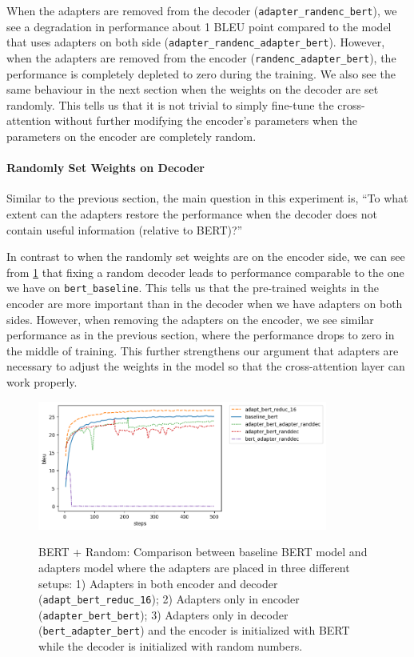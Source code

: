 When the adapters are removed from the decoder (\texttt{adapter\_randenc\_bert}), we see a degradation in performance about 1 BLEU point compared to the model that uses adapters on both side (\texttt{adapter\_randenc\_adapter\_bert}). However, when the adapters are removed from the encoder (\texttt{randenc\_adapter\_bert}), the performance is completely depleted to zero during the training. We also see the same behaviour in the next section when the weights on the decoder are set randomly. This tells us that it is not trivial to simply fine-tune the cross-attention without further modifying the encoder's parameters when the parameters on the encoder are completely random.

\paragraph{Randomly Set Weights on Decoder}
Similar to the previous section, the main question in this experiment is, ``To what extent can the adapters restore the performance when the decoder does not contain useful information (relative to BERT)?''

In contrast to when the randomly set weights are on the encoder side, we can see from \cref{img:adapt_bert_randdec} that fixing a random decoder leads to performance comparable to the one we have on \texttt{bert\_baseline}. This tells us that the pre-trained weights in the encoder are more important than in the decoder when we have adapters on both sides. However, when removing the adapters on the encoder, we see similar performance as in the previous section, where the performance drops to zero in the middle of training. This further strengthens our argument that adapters are necessary to adjust the weights in the model so that the cross-attention layer can work properly.

\begin{figure}[h]
    {\includegraphics[width=0.85\textwidth]{img/adapter_bert_randdec.png}}
    \centering
    \caption[BERT + Random: Comparison for model with adapters in the decoder and the decoder is initalized with random weights.]{BERT + Random: Comparison between baseline BERT model and adapters model where the adapters are placed in three different setups: 1) Adapters in both encoder and decoder (\texttt{adapt\_bert\_reduc\_16}); 2) Adapters only in encoder (\texttt{adapter\_bert\_bert}); 3) Adapters only in decoder (\texttt{bert\_adapter\_bert}) and the encoder is initialized with BERT while the decoder is initialized with random numbers.}
    \label{img:adapt_bert_randdec}
\end{figure}


